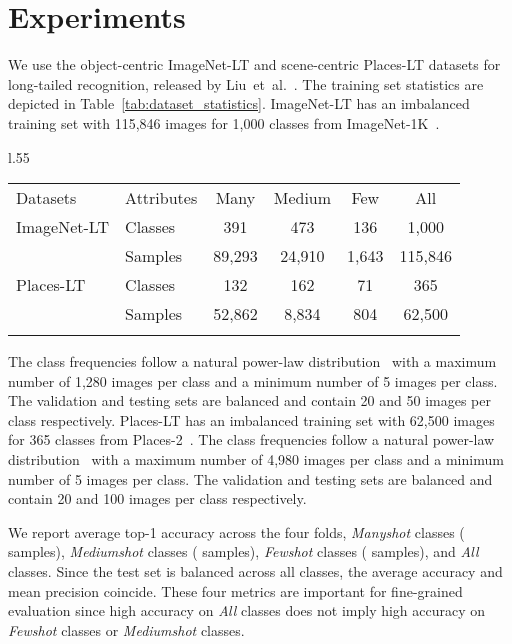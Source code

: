 \documentclass[runningheads]{llncs}
\newcommand{\myparagraph}[1]{\noindent{\bf #1}}
\begin{document}
\section{Experiments}

\myparagraph{Datasets.} We use the object-centric ImageNet-LT and scene-centric Places-LT datasets for long-tailed recognition, released by Liu~et~al.~\cite{liu2019large}. The training set statistics are depicted in Table~\ref{tab:dataset_statistics}. ImageNet-LT has an imbalanced training set with 115,846 images for 1,000 classes from ImageNet-1K~\cite{deng2009imagenet}.

\begin{wraptable}{l}{.55\linewidth}
\vspace{-2em}
\scriptsize
\caption{Statistics for training sets in ImageNet-LT and Places-LT.}
\begin{tabular}{ l | l | c c c c }
\Xhline{2\arrayrulewidth}
Datasets & Attributes & Many & Medium & Few & All \\
\Xhline{2\arrayrulewidth}
ImageNet-LT & Classes & 391 & 473 & 136 & 1,000 \\
 & Samples & 89,293 & 24,910 & 1,643 & 115,846 \\ \hline
Places-LT & Classes & 132 & 162 & 71 & 365 \\
 & Samples & 52,862 & 8,834 & 804 & 62,500 \\
\Xhline{2\arrayrulewidth}
\end{tabular}
\vspace{-2em}
\label{tab:dataset_statistics}
\end{wraptable}

The class frequencies follow a natural power-law distribution~\cite{van2017devil} with a maximum number of 1,280 images per class and a minimum number of 5 images per class. The validation and testing sets are balanced and contain 20 and 50 images per class respectively. Places-LT has an imbalanced training set with 62,500 images for 365 classes from Places-2~\cite{zhou2017places}. The class frequencies follow a natural power-law distribution~\cite{van2017devil} with a maximum number of 4,980 images per class and a minimum number of 5 images per class. The validation and testing sets are balanced and contain 20 and 100 images per class respectively. 

\myparagraph{Evaluation metrics.} We report average top-1 accuracy across the four folds,  \emph{Manyshot} classes ( samples), \emph{Mediumshot} classes ( samples), \emph{Fewshot} classes ( samples), and \emph{All} classes. Since the test set is balanced across all classes, the average accuracy and mean precision coincide. These four metrics are important for fine-grained evaluation since high accuracy on \emph{All} classes does not imply high accuracy on \emph{Fewshot} classes or \emph{Mediumshot} classes.
\end{document}
